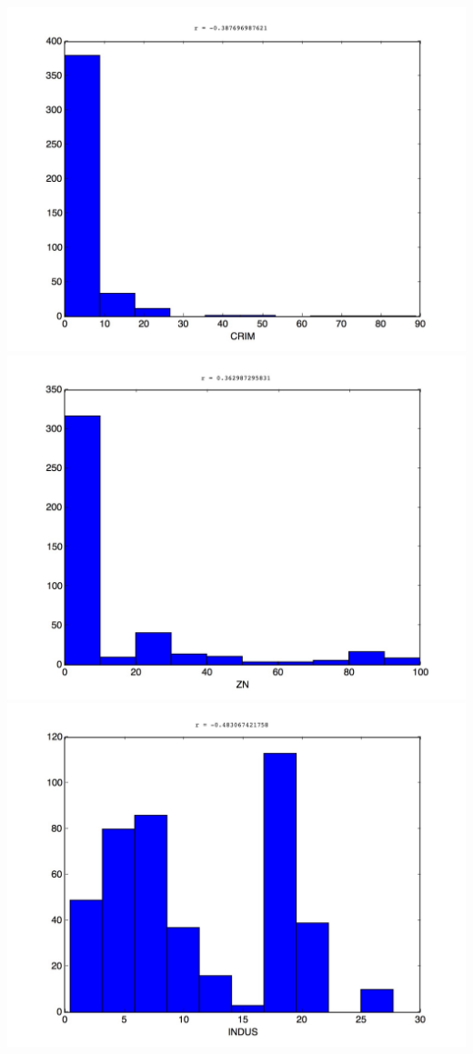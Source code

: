 \documentclass[]{report}
\begin{document}
		\begin{center}
			\includegraphics[scale=0.2]{hist_0}\\
			\includegraphics[scale=0.2]{hist_1}\\
			\includegraphics[scale=0.2]{hist_2}\\

\end{center}
\end{document}
